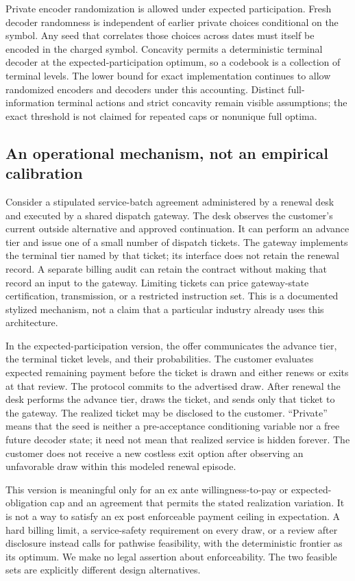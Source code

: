 Private encoder randomization is allowed under expected participation. Fresh decoder randomness is independent of earlier private choices conditional on the symbol. Any seed that correlates those choices across dates must itself be encoded in the charged symbol. Concavity permits a deterministic terminal decoder at the expected-participation optimum, so a codebook is a collection of terminal levels. The lower bound for exact implementation continues to allow randomized encoders and decoders under this accounting. Distinct full-information terminal actions and strict concavity remain visible assumptions; the exact threshold is not claimed for repeated caps or nonunique full optima.

\subsection{An operational mechanism, not an empirical calibration}
Consider a stipulated service-batch agreement administered by a renewal desk and executed by a shared dispatch gateway. The desk observes the customer's current outside alternative and approved continuation. It can perform an advance tier and issue one of a small number of dispatch tickets. The gateway implements the terminal tier named by that ticket; its interface does not retain the renewal record. A separate billing audit can retain the contract without making that record an input to the gateway. Limiting tickets can price gateway-state certification, transmission, or a restricted instruction set. This is a documented stylized mechanism, not a claim that a particular industry already uses this architecture.

In the expected-participation version, the offer communicates the advance tier, the terminal ticket levels, and their probabilities. The customer evaluates expected remaining payment before the ticket is drawn and either renews or exits at that review. The protocol commits to the advertised draw. After renewal the desk performs the advance tier, draws the ticket, and sends only that ticket to the gateway. The realized ticket may be disclosed to the customer. ``Private'' means that the seed is neither a pre-acceptance conditioning variable nor a free future decoder state; it need not mean that realized service is hidden forever. The customer does not receive a new costless exit option after observing an unfavorable draw within this modeled renewal episode.

This version is meaningful only for an ex ante willingness-to-pay or expected-obligation cap and an agreement that permits the stated realization variation. It is not a way to satisfy an ex post enforceable payment ceiling in expectation. A hard billing limit, a service-safety requirement on every draw, or a review after disclosure instead calls for pathwise feasibility, with the deterministic frontier as its optimum. We make no legal assertion about enforceability. The two feasible sets are explicitly different design alternatives.

